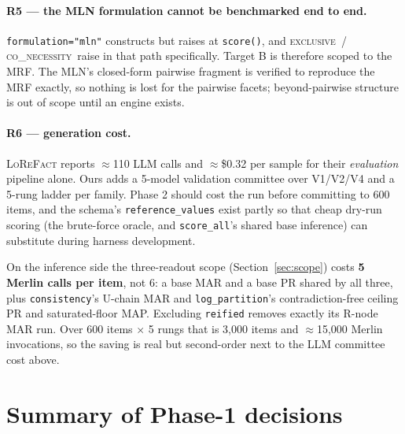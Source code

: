 \documentclass[11pt]{article}
\newcommand{\cExc}{\textsc{exclusive}}
\newcommand{\cCoN}{\textsc{co\_necessity}}
\newcommand{\readout}[1]{\texttt{#1}}
\begin{document}
\paragraph{R5 --- the MLN formulation cannot be benchmarked end to end.}
\texttt{formulation="mln"} constructs but raises at \texttt{score()}, and \cExc\ / \cCoN\ raise
in that path specifically. Target B is therefore scoped to the MRF. The MLN's closed-form
pairwise fragment is verified to reproduce the MRF exactly, so nothing is lost for the pairwise
facets; beyond-pairwise structure is out of scope until an engine exists.

\paragraph{R6 --- generation cost.}
\textsc{LoReFact} reports $\approx$110 LLM calls and $\approx$\$0.32 per sample for their
\emph{evaluation} pipeline alone. Ours adds a 5-model validation committee over V1/V2/V4 and a
5-rung ladder per family. Phase 2 should cost the run before committing to 600 items, and the
schema's \texttt{reference\_values} exist partly so that cheap dry-run scoring (the brute-force
oracle, and \texttt{score\_all}'s shared base inference) can substitute during harness
development.

On the inference side the three-readout scope (Section~\ref{sec:scope}) costs \textbf{5 Merlin
calls per item}, not 6: a base MAR and a base PR shared by all three, plus
\readout{consistency}'s U-chain MAR and \readout{log\_partition}'s contradiction-free ceiling PR
and saturated-floor MAP. Excluding \texttt{reified} removes exactly its R-node MAR run. Over 600
items $\times$ 5 rungs that is 3{,}000 items and $\approx$15{,}000 Merlin invocations, so the
saving is real but second-order next to the LLM committee cost above.

\section{Summary of Phase-1 decisions}
\label{sec:summary}
\end{document}
